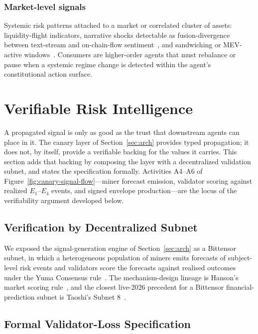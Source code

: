 \documentclass[journal]{IEEEtran}
\begin{document}
\subsubsection{Market-level signals}
Systemic risk patterns attached to a market or correlated cluster of
assets: liquidity-flight indicators, narrative shocks
detectable as fusion-divergence between text-stream and on-chain-flow
sentiment~\cite{cong2022crypto}, and sandwiching or MEV-active
windows~\cite{daian2020flash}. Consumers are higher-order agents that
must rebalance or pause when a systemic regime change is detected
within the agent's constitutional action surface.

\section{Verifiable Risk Intelligence}\label{sec:vri}

A propagated signal is only as good as the trust that downstream
agents can place in it. The canary layer of Section~\ref{sec:arch}
provides typed propagation; it does not, by itself, provide a
verifiable backing for the values it carries. This section adds that
backing by composing the layer with a decentralized validation
subnet, and states the specification formally. Activities A4--A6 of
Figure~\ref{fig:canary-signal-flow}---miner forecast emission,
validator scoring against realized $E_1$--$E_4$ events, and signed
envelope production---are the locus of the verifiability argument
developed below.

\subsection{Verification by Decentralized Subnet}

We exposed the signal-generation engine of Section~\ref{sec:arch} as
a Bittensor subnet, in which a heterogeneous population of miners
emits forecasts of subject-level risk events and validators score the
forecasts against realised outcomes under the Yuma Consensus
rule~\cite{rao2021bittensor,steeves2022incentivizing,opentensor2024yuma}.
The mechanism-design lineage is Hanson's market scoring
rule~\cite{hanson2003combinatorial}, and the closest live-2026
precedent for a Bittensor financial-prediction subnet is Taoshi's
Subnet 8~\cite{taoshi2024ptn}.

\subsection{Formal Validator-Loss Specification}\label{sec:vri:formal}
\end{document}

